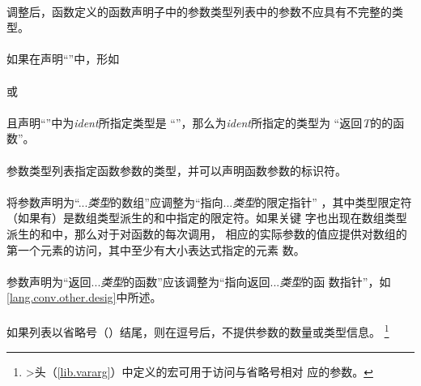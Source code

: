 {\paragraph{}
调整后，函数定义的函数声明子中的参数类型列表中的参数不应具有不完整的类型。

\semantic
\paragraph{}
如果在声明``''中，形如                                        \\
\mbox{\hspace{4em}  \tm{)}}                    \\
或                                                                            \\
\mbox{\hspace{4em}  \tm{)}}              \\
且声明``''中为\textit{ident}所指定类型是
``''，那么为\textit{ident}所指定的类型为
``返回\textit{T}的的函数''。

\paragraph{}
参数类型列表指定函数参数的类型，并可以声明函数参数的标识符。

\paragraph{}
将参数声明为``...\textit{类型}的数组''应调整为``指向...\textit{类型}的限定指针''
，其中类型限定符（如果有）是数组类型派生的\tm{[}和\tm{]}中指定的限定符。如果关键
字也出现在数组类型派生的\tm{[}和\tm{]}中，那么对于对函数的每次调用，
相应的实际参数的值应提供对数组的第一个元素的访问，其中至少有大小表达式指定的元素
数。

\paragraph{}
参数声明为``返回...\textit{类型}的函数''应该调整为``指向返回...\textit{类型}的函
数指针''，如\ref{lang.conv.other.desig}中所述。

\paragraph{}
如果列表以省略号（）结尾，则在逗号后，不提供参数的数量或类型信息。
\footnote{>头（\ref{lib.vararg}）中定义的宏可用于访问与省略号相对
应的参数。}

}
